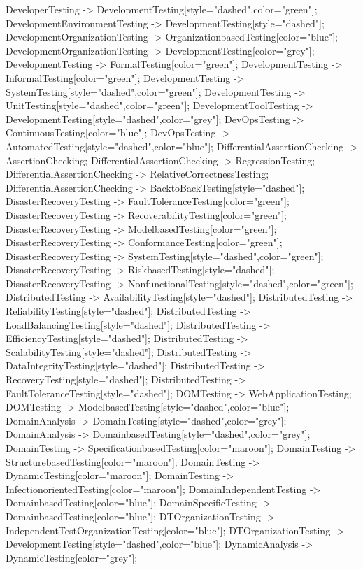 \documentclass{article}
\begin{document}
{DeveloperTesting -> DevelopmentTesting[style="dashed",color="green"];
DevelopmentEnvironmentTesting -> DevelopmentTesting[style="dashed"];
DevelopmentOrganizationTesting -> OrganizationbasedTesting[color="blue"];
DevelopmentOrganizationTesting -> DevelopmentTesting[color="grey"];
DevelopmentTesting -> FormalTesting[color="green"];
DevelopmentTesting -> InformalTesting[color="green"];
DevelopmentTesting -> SystemTesting[style="dashed",color="green"];
DevelopmentTesting -> UnitTesting[style="dashed",color="green"];
DevelopmentToolTesting -> DevelopmentTesting[style="dashed",color="grey"];
DevOpsTesting -> ContinuousTesting[color="blue"];
DevOpsTesting -> AutomatedTesting[style="dashed",color="blue"];
DifferentialAssertionChecking -> AssertionChecking;
DifferentialAssertionChecking -> RegressionTesting;
DifferentialAssertionChecking -> RelativeCorrectnessTesting;
DifferentialAssertionChecking -> BacktoBackTesting[style="dashed"];
DisasterRecoveryTesting -> FaultToleranceTesting[color="green"];
DisasterRecoveryTesting -> RecoverabilityTesting[color="green"];
DisasterRecoveryTesting -> ModelbasedTesting[color="green"];
DisasterRecoveryTesting -> ConformanceTesting[color="green"];
DisasterRecoveryTesting -> SystemTesting[style="dashed",color="green"];
DisasterRecoveryTesting -> RiskbasedTesting[style="dashed"];
DisasterRecoveryTesting -> NonfunctionalTesting[style="dashed",color="green"];
DistributedTesting -> AvailabilityTesting[style="dashed"];
DistributedTesting -> ReliabilityTesting[style="dashed"];
DistributedTesting -> LoadBalancingTesting[style="dashed"];
DistributedTesting -> EfficiencyTesting[style="dashed"];
DistributedTesting -> ScalabilityTesting[style="dashed"];
DistributedTesting -> DataIntegrityTesting[style="dashed"];
DistributedTesting -> RecoveryTesting[style="dashed"];
DistributedTesting -> FaultToleranceTesting[style="dashed"];
DOMTesting -> WebApplicationTesting;
DOMTesting -> ModelbasedTesting[style="dashed",color="blue"];
DomainAnalysis -> DomainTesting[style="dashed",color="grey"];
DomainAnalysis -> DomainbasedTesting[style="dashed",color="grey"];
DomainTesting -> SpecificationbasedTesting[color="maroon"];
DomainTesting -> StructurebasedTesting[color="maroon"];
DomainTesting -> DynamicTesting[color="maroon"];
DomainTesting -> InfectionorientedTesting[color="maroon"];
DomainIndependentTesting -> DomainbasedTesting[color="blue"];
DomainSpecificTesting -> DomainbasedTesting[color="blue"];
DTOrganizationTesting -> IndependentTestOrganizationTesting[color="blue"];
DTOrganizationTesting -> DevelopmentTesting[style="dashed",color="blue"];
DynamicAnalysis -> DynamicTesting[color="grey"];
}
\end{document}
